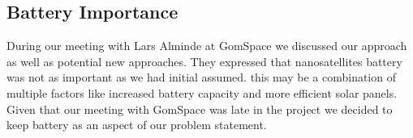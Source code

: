 \subsection{Battery Importance}
During our meeting with Lars Alminde at GomSpace we discussed our approach as well as potential new approaches. They expressed that nanosatellites battery was not as important as we had initial assumed\cite{gom_space_conversation}. this may be a combination of multiple factors like increased battery capacity and more efficient solar panels. Given that our meeting with GomSpace was late in the project we decided to keep battery as an aspect of our problem statement.

